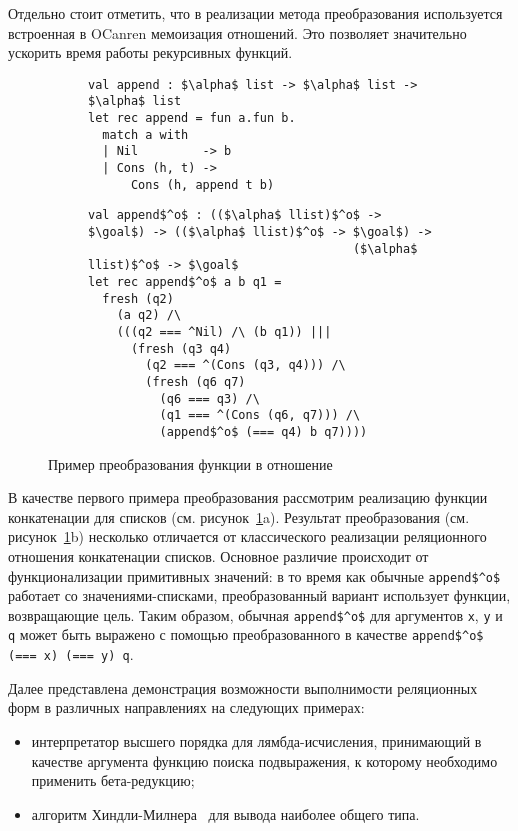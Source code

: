 Отдельно стоит отметить, что в реализации метода преобразования используется встроенная в OCanren мемоизация отношений. Это позволяет значительно ускорить время работы рекурсивных функций.

\begin{figure}[h]
  \begin{subfigure}[t]{1\textwidth}
    \begin{lstlisting}[basicstyle=\small]
val append : $\alpha$ list -> $\alpha$ list -> $\alpha$ list
let rec append = fun a.fun b.
  match a with
  | Nil         -> b
  | Cons (h, t) ->
      Cons (h, append t b)
    \end{lstlisting}
    \vskip-4mm
    \caption{}
  \end{subfigure}
  \vskip5mm
  \begin{subfigure}[t]{1\textwidth}
    \begin{lstlisting}[basicstyle=\small]
val append$^o$ : (($\alpha$ llist)$^o$ -> $\goal$) -> (($\alpha$ llist)$^o$ -> $\goal$) ->
                                     ($\alpha$ llist)$^o$ -> $\goal$
let rec append$^o$ a b q1 =
  fresh (q2)
    (a q2) /\
    (((q2 === ^Nil) /\ (b q1)) |||
      (fresh (q3 q4)
        (q2 === ^(Cons (q3, q4))) /\
        (fresh (q6 q7)
          (q6 === q3) /\
          (q1 === ^(Cons (q6, q7))) /\
          (append$^o$ (=== q4) b q7))))
    \end{lstlisting}
    \vskip-4mm
    \caption{}
  \end{subfigure}
  \vskip5mm
  \caption{Пример преобразования функции в отношение}
  \label{relational_conversion_example}
\end{figure}

В качестве первого примера преобразования рассмотрим реализацию функции конкатенации для списков (см. рисунок~\ref{relational_conversion_example}a).
Результат преобразования (см. рисунок~\ref{relational_conversion_example}b) несколько отличается от классического реализации реляционного отношения конкатенации списков. Основное различие происходит от функционализации примитивных значений: в то время как обычные \lstinline|append$^o$| работает со значениями-списками, преобразованный вариант использует функции, возвращающие цель. Таким образом, обычная \lstinline {append$^o$} для аргументов \lstinline|x|, \lstinline|y| и \lstinline |q| может быть выражено с помощью преобразованного в качестве \lstinline{append$^o$ (=== x) (=== y) q}.

Далее представлена демонстрация возможности выполнимости реляционных форм
в различных направлениях на следующих примерах:
\begin{itemize}
\item интерпретатор высшего порядка для лямбда-исчисления, принимающий в качестве аргумента функцию поиска подвыражения, к которому необходимо применить бета-редукцию;
\item алгоритм Хиндли-Милнера~\cite{lozov-spbu:Barendregt} для вывода наиболее общего типа.
\end{itemize}

